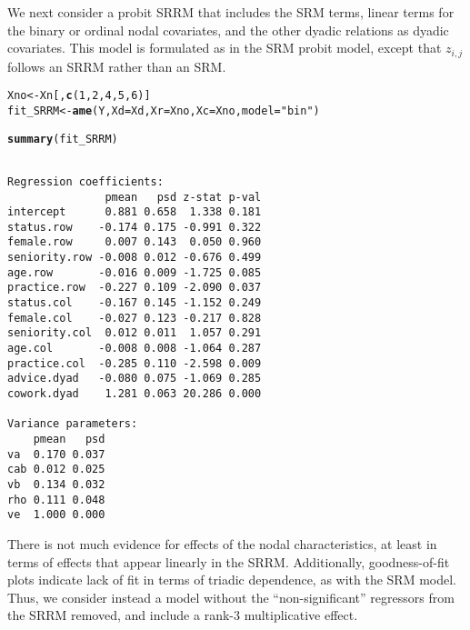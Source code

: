 \documentclass[11pt]{article}\usepackage[]{graphicx}\usepackage[]{color}
\makeatletter
\newcommand{\hlnum}[1]{\textcolor[rgb]{0.686,0.059,0.569}{#1}}%
\newcommand{\hlstr}[1]{\textcolor[rgb]{0.192,0.494,0.8}{#1}}%
\newcommand{\hlstd}[1]{\textcolor[rgb]{0.345,0.345,0.345}{#1}}%
\newcommand{\hlkwb}[1]{\textcolor[rgb]{0.69,0.353,0.396}{#1}}%
\newcommand{\hlkwc}[1]{\textcolor[rgb]{0.333,0.667,0.333}{#1}}%
\newcommand{\hlkwd}[1]{\textcolor[rgb]{0.737,0.353,0.396}{\textbf{#1}}}%
\newenvironment{kframe}{%
 \def\at@end@of@kframe{}%
 \ifinner\ifhmode%
  \def\at@end@of@kframe{\end{minipage}}%
  \begin{minipage}{\columnwidth}%
 \fi\fi%
 \def\FrameCommand##1{\hskip\@totalleftmargin \hskip-\fboxsep
 \colorbox{shadecolor}{##1}\hskip-\fboxsep
     \hskip-\linewidth \hskip-\@totalleftmargin \hskip\columnwidth}%
 \MakeFramed {\advance\hsize-\width
   \@totalleftmargin\z@ \linewidth\hsize
   \@setminipage}}%
 {\par\unskip\endMakeFramed%
 \at@end@of@kframe}
\newenvironment{knitrout}{}{} %
\makeatother
\begin{document}
We next consider a probit SRRM that includes the SRM terms,
linear terms for the binary or  ordinal nodal covariates, 
and the other dyadic 
relations as dyadic covariates. This model is formulated as 
in the SRM probit model, except that $z_{i,j}$ follows an 
SRRM rather than an SRM. 

\begin{knitrout}\footnotesize
{}\color{fgcolor}\begin{kframe}
\begin{alltt}
\hlstd{Xno}\hlkwb{<-}\hlstd{Xn[,}\hlkwd{c}\hlstd{(}\hlnum{1}\hlstd{,}\hlnum{2}\hlstd{,}\hlnum{4}\hlstd{,}\hlnum{5}\hlstd{,}\hlnum{6}\hlstd{)]}
\hlstd{fit_SRRM}\hlkwb{<-}\hlkwd{ame}\hlstd{(Y,} \hlkwc{Xd}\hlstd{=Xd,} \hlkwc{Xr}\hlstd{=Xno,} \hlkwc{Xc}\hlstd{=Xno,} \hlkwc{model}\hlstd{=}\hlstr{"bin"}\hlstd{)}
\end{alltt}
\end{kframe}
\end{knitrout}

\begin{knitrout}\footnotesize
{}\color{fgcolor}\begin{kframe}
\begin{alltt}
\hlkwd{summary}\hlstd{(fit_SRRM)}
\end{alltt}
\begin{verbatim}

Regression coefficients:
               pmean   psd z-stat p-val
intercept      0.881 0.658  1.338 0.181
status.row    -0.174 0.175 -0.991 0.322
female.row     0.007 0.143  0.050 0.960
seniority.row -0.008 0.012 -0.676 0.499
age.row       -0.016 0.009 -1.725 0.085
practice.row  -0.227 0.109 -2.090 0.037
status.col    -0.167 0.145 -1.152 0.249
female.col    -0.027 0.123 -0.217 0.828
seniority.col  0.012 0.011  1.057 0.291
age.col       -0.008 0.008 -1.064 0.287
practice.col  -0.285 0.110 -2.598 0.009
advice.dyad   -0.080 0.075 -1.069 0.285
cowork.dyad    1.281 0.063 20.286 0.000

Variance parameters:
    pmean   psd
va  0.170 0.037
cab 0.012 0.025
vb  0.134 0.032
rho 0.111 0.048
ve  1.000 0.000
\end{verbatim}
\end{kframe}
\end{knitrout}
There is not much evidence for effects of the 
nodal characteristics, at least in terms of  effects  
that appear linearly in the SRRM. 
Additionally, goodness-of-fit plots 
indicate lack of fit in terms of triadic dependence, 
as with the SRM model. 
Thus, we consider instead a model without the 
``non-significant'' regressors from the SRRM removed, and 
include a rank-3 multiplicative effect. 
\end{document}
